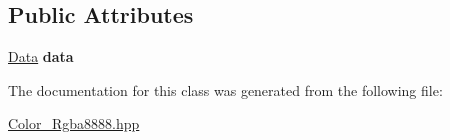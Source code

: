 \subsection*{Public Attributes}
\begin{DoxyCompactItemize}
\item 
\mbox{\label{classexample_1_1_color___r_g_b_a8888_afa202f60e94aeaa296610ae217a1d80d}} 
\mbox{\hyperlink{unionexample_1_1_color___r_g_b_a8888_1_1_data}{Data}} {\bfseries data}
\end{DoxyCompactItemize}


The documentation for this class was generated from the following file\+:\begin{DoxyCompactItemize}
\item 
\mbox{\hyperlink{_color___rgba8888_8hpp}{Color\+\_\+\+Rgba8888.\+hpp}}\end{DoxyCompactItemize}
